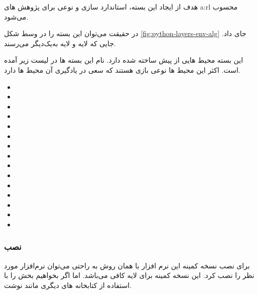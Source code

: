  هدف از ایجاد این بسته، استاندارد سازی 
و نوعی 
برای پژوهش های 
\gls*{a:rl}
محسوب می‌شود.\cite{medgyminstall}

در حقیقت می‌توان این بسته را در وسط شکل
\ref{fig:python-layers-env-alg}
جای‌ داد. جایی که لایه 
و لایه 
به‌یک‌دیگر می‌رسند. 

 این بسته محیط هایی از پیش ساخته شده دارد. نام این بسته ها در لیست زیر
 آمده است. 
 اکثر این محیط ها نوعی بازی هستند که 
 سعی در یادگیری آن محیط ها دارد.

 
\begin{multicols}{2}\scriptsize{}
\begin{itemize}
\item {}
\item {}
\item {}
\item {}
\item {}
\item {}
\item {}
\item {}
\item {}
\item {}
\item {}
\item {}
\item {}
\item {}
\item {}
\end{itemize}
\end{multicols}



\subsubsection{نصب}
 برای نصب نسخه کمینه این نرم افزار با همان روش  به راحتی می‌توان نرم‌افزار مورد نظر را نصب کرد.
 \cite{git/gym}
 این نسخه کمینه برای لایه 
 کافی می‌باشد. اما اگر بخواهیم بخش  را با استفاده از کتابخانه های دیگری مانند  نوشت.
\cite{uclRL}